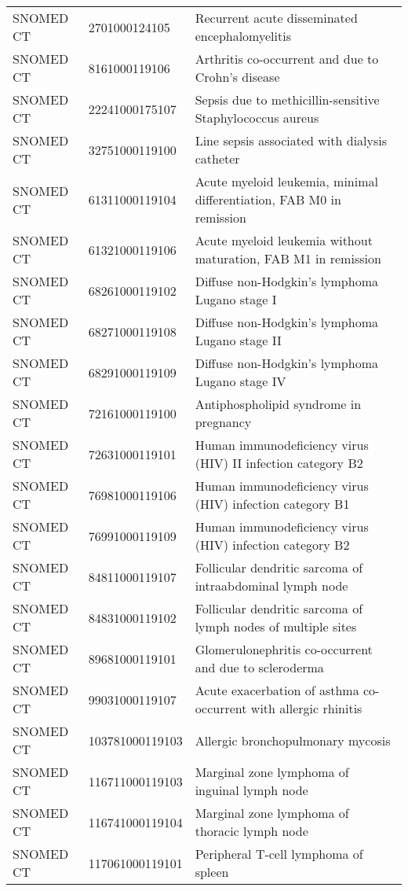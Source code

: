 \begin{longtable}{p{}p{}p{}}
  SNOMED CT & 2701000124105 & Recurrent acute disseminated encephalomyelitis \\ 
  SNOMED CT & 8161000119106 & Arthritis co-occurrent and due to Crohn's disease \\ 
  SNOMED CT & 22241000175107 & Sepsis due to methicillin-sensitive Staphylococcus aureus \\ 
  SNOMED CT & 32751000119100 & Line sepsis associated with dialysis catheter \\ 
  SNOMED CT & 61311000119104 & Acute myeloid leukemia, minimal differentiation, FAB M0 in remission \\ 
  SNOMED CT & 61321000119106 & Acute myeloid leukemia without maturation, FAB M1 in remission \\ 
  SNOMED CT & 68261000119102 & Diffuse non-Hodgkin's lymphoma Lugano stage I \\ 
  SNOMED CT & 68271000119108 & Diffuse non-Hodgkin's lymphoma Lugano stage II \\ 
  SNOMED CT & 68291000119109 & Diffuse non-Hodgkin's lymphoma Lugano stage IV \\ 
  SNOMED CT & 72161000119100 & Antiphospholipid syndrome in pregnancy \\ 
  SNOMED CT & 72631000119101 & Human immunodeficiency virus (HIV) II infection category B2 \\ 
  SNOMED CT & 76981000119106 & Human immunodeficiency virus (HIV) infection category B1 \\ 
  SNOMED CT & 76991000119109 & Human immunodeficiency virus (HIV) infection category B2 \\ 
  SNOMED CT & 84811000119107 & Follicular dendritic sarcoma of intraabdominal lymph node \\ 
  SNOMED CT & 84831000119102 & Follicular dendritic sarcoma of lymph nodes of multiple sites \\ 
  SNOMED CT & 89681000119101 & Glomerulonephritis co-occurrent and due to scleroderma \\ 
  SNOMED CT & 99031000119107 & Acute exacerbation of asthma co-occurrent with allergic rhinitis \\ 
  SNOMED CT & 103781000119103 & Allergic bronchopulmonary mycosis \\ 
  SNOMED CT & 116711000119103 & Marginal zone lymphoma of inguinal lymph node \\ 
  SNOMED CT & 116741000119104 & Marginal zone lymphoma of thoracic lymph node \\ 
  SNOMED CT & 117061000119101 & Peripheral T-cell lymphoma of spleen \\ 

\end{longtable}
